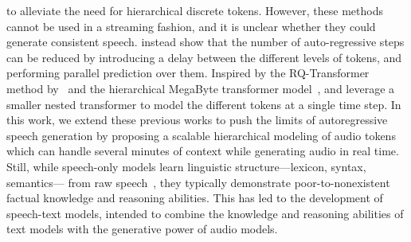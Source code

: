 to alleviate the need for hierarchical discrete tokens. However, these methods cannot be used in a streaming fashion, and it is unclear whether they could generate consistent speech. \citet{musicgen} instead show that the number of auto-regressive steps can be reduced by introducing a delay between the different levels of tokens, and performing parallel prediction over them. Inspired by the RQ-Transformer method by~\citet{rqtransformer} and the hierarchical MegaByte transformer model~\citep{yu2024megabyte},
\citet{uniaudio} and \citet{zhu2024generativepretrainedspeechlanguage} leverage a smaller nested transformer to model the different tokens at a single time step. In this work, we extend these previous works to push the limits of autoregressive speech generation by proposing a scalable hierarchical modeling of audio tokens which can handle several minutes of context while generating audio in real time. Still, while speech-only models learn linguistic structure---lexicon, syntax, semantics--- from raw speech~\citep{zerospeech21}, they typically demonstrate poor-to-nonexistent factual knowledge and reasoning abilities. This has led to the development of speech-text models, intended to combine the knowledge and reasoning abilities of text models with the generative power of audio models.



